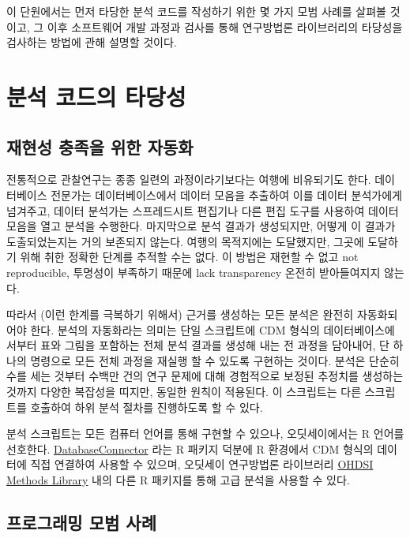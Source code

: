 \documentclass[10.5pt]{book}
\theoremstyle{definition}
\theoremstyle{definition}
\theoremstyle{definition}
\theoremstyle{remark}
\begin{document}
이 단원에서는 먼저 타당한 분석 코드를 작성하기 위한 몇 가지 모범 사례를
살펴볼 것이고, 그 이후 소프트웨어 개발 과정과 검사를 통해 연구방법론
라이브러리의 타당성을 검사하는 방법에 관해 설명할 것이다.

\section{분석 코드의 타당성}\label{--}

\subsection{재현성 충족을 위한 자동화}\label{automation}

전통적으로 관찰연구는 종종 일련의 과정이라기보다는 여행에 비유되기도
한다. 데이터베이스 전문가는 데이터베이스에서 데이터 모음을 추출하여 이를
데이터 분석가에게 넘겨주고, 데이터 분석가는 스프레드시트 편집기나 다른
편집 도구를 사용하여 데이터 모음을 열고 분석을 수행한다. 마지막으로 분석
결과가 생성되지만, 어떻게 이 결과가 도출되었는지는 거의 보존되지 않는다.
여행의 목적지에는 도달했지만, 그곳에 도달하기 위해 취한 정확한 단계를
추적할 수는 없다. 이 방법은 재현할 수 없고 not reproducible, 투명성이
부족하기 때문에 lack transparency 온전히 받아들여지지 않는다.

따라서 (이런 한계를 극복하기 위해서) 근거를 생성하는 모든 분석은 완전히
자동화되어야 한다. 분석의 자동화라는 의미는 단일 스크립트에 CDM 형식의
데이터베이스에서부터 표와 그림을 포함하는 전체 분석 결과를 생성해 내는
전 과정을 담아내어, 단 하나의 명령으로 모든 전체 과정을 재실행 할 수
있도록 구현하는 것이다. 분석은 단순히 수를 세는 것부터 수백만 건의 연구
문제에 대해 경험적으로 보정된 추정치를 생성하는 것까지 다양한 복잡성을
띠지만, 동일한 원칙이 적용된다. 이 스크립트는 다른 스크립트를 호출하여
하위 분석 절차를 진행하도록 할 수 있다.

분석 스크립트는 모든 컴퓨터 언어를 통해 구현할 수 있으나, 오딧세이에서는
R 언어를 선호한다.
\href{https://ohdsi.github.io/DatabaseConnector/}{DatabaseConnector}
라는 R 패키지 덕분에 R 환경에서 CDM 형식의 데이터에 직접 연결하여 사용할
수 있으며, 오딧세이 연구방법론 라이브러리
\href{https://ohdsi.github.io/MethodsLibrary/}{OHDSI Methods Library}
내의 다른 R 패키지를 통해 고급 분석을 사용할 수 있다.

\subsection{프로그래밍 모범 사례}\label{--}
\end{document}
